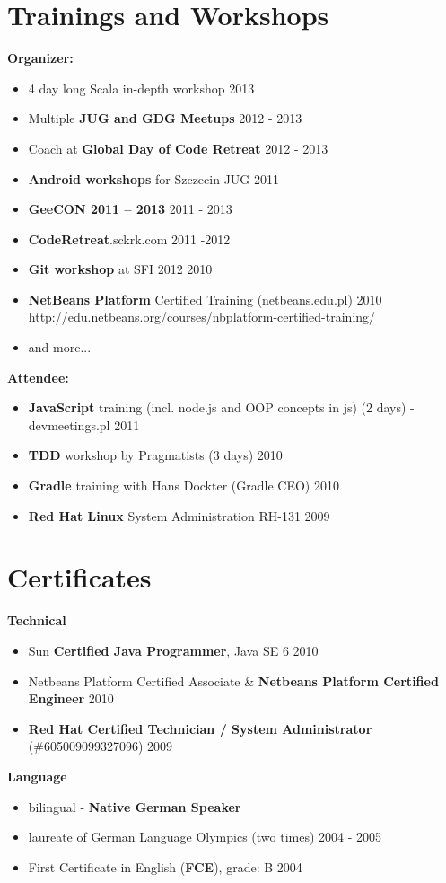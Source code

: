 \documentclass{res}
\begin{document}
\begin{resume}
\section{Trainings and Workshops}
{\bf Organizer:}
\begin{itemize}
 \item 4 day long Scala in-depth workshop \hfill 2013
 \item Multiple \textbf{JUG and GDG Meetups} \hfill 2012 - 2013
 \item Coach at \textbf{Global Day of Code Retreat} \hfill 2012 - 2013
 \item \textbf{Android workshops} for Szczecin JUG \hfill 2011
 \item \textbf{GeeCON 2011 -- 2013} \hfill 2011 - 2013
 \item \textbf{CodeRetreat}.sckrk.com \hfill 2011 -2012
 \item \textbf{Git workshop} at SFI 2012 \hfill 2010
 \item \textbf{NetBeans Platform} Certified Training (netbeans.edu.pl) \hfill 2010 \\
	http://edu.netbeans.org/courses/nbplatform-certified-training/ 
 \item and more...
\end{itemize}
{\bf Attendee:}
\begin{itemize}
 \item \textbf{JavaScript} training (incl. node.js and OOP concepts in js) (2 days) - devmeetings.pl \hfill 2011
 \item \textbf{TDD} workshop by Pragmatists (3 days) \hfill 2010
 \item \textbf{Gradle} training with Hans Dockter (Gradle CEO) \hfill 2010
 \item \textbf{Red Hat Linux} System Administration RH-131 \hfill 2009
\end{itemize}

\section{Certificates} 
{\bf Technical}
\begin{itemize}
 \item Sun \textbf{Certified Java Programmer}, Java SE 6 \hfill 2010
 \item Netbeans Platform Certified Associate \& \textbf{Netbeans Platform Certified Engineer} \hfill 2010
 \item \textbf{Red Hat Certified Technician / System
Administrator} (\#605009099327096) \hfill 2009\\
\end{itemize}
{\bf Language}
\begin{itemize}
 \item bilingual - \textbf{Native German Speaker}
 \item laureate of German Language Olympics (two times) \hfill 2004 - 2005
 \item First Certificate in English (\textbf{FCE}), grade: B \hfill 2004
\end{itemize}


\end{resume}
\end{document}
